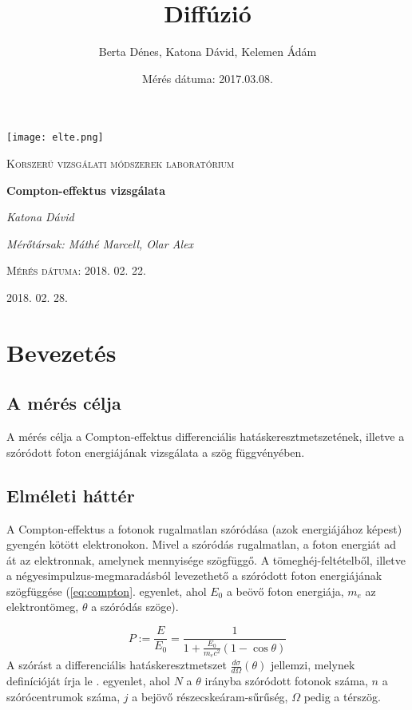 \documentclass[a4paper,12pt]{article}
\title{Diffúzió}
\author{Berta Dénes, Katona Dávid, Kelemen Ádám}
\date{Mérés dátuma: 2017.03.08.}
\begin{document}
 
\begin{titlepage}
	\centering
	\texttt{[image: elte.png]}\par\vspace{1cm}
	{\scshape\LARGE Korszerű vizsgálati módszerek laboratórium \par}
	
	\vspace{1cm}
	{\huge\bfseries Compton-effektus vizsgálata\par}
	\vspace{1cm}
	{\Large\itshape Katona Dávid\par}
	\vspace{1cm}
	{\itshape Mérőtársak: Máthé Marcell, Olar Alex\par}
	\vspace{0.5cm}
	{\scshape Mérés dátuma: 2018. 02. 22.\par}


	\vfill

	{\large  2018. 02. 28.\par}
\end{titlepage}

 \section*{Bevezetés}
 
 \subsection*{A mérés célja}
 A mérés célja a Compton-effektus differenciális hatáskeresztmetszetének, illetve a szóródott foton energiájának vizsgálata a szög függvényében.

 \subsection*{Elméleti háttér}
 A Compton-effektus a fotonok rugalmatlan szóródása (azok energiájához képest) gyengén kötött elektronokon. Mivel a szóródás rugalmatlan, a foton energiát ad át az elektronnak, amelynek mennyisége szögfüggő. A tömeghéj-feltételből, illetve a négyesimpulzus-megmaradásból levezethető a szóródott foton energiájának szögfüggése (\ref{eq:compton}. egyenlet, ahol $E_0$ a beövő foton energiája, $m_e$ az elektrontömeg, $\theta$ a szóródás szöge).
 
 \begin{equation}
	P:= \frac{E}{E_0}=\frac{1}{1+\frac{E_0}{m_ec^2}(1-\cos{\theta})}
 	\label{eq:compton}
 \end{equation}
 A szórást a differenciális hatáskeresztmetszet $\frac{d\sigma}{d\Omega}(\theta)$ jellemzi, melynek definícióját írja le . egyenlet, ahol $N$ a $\theta$ irányba szóródott fotonok száma, $n$ a szórócentrumok száma, $j$ a bejövő részecskeáram-sűrűség, $\Omega$ pedig a térszög.
 
\end{document}
